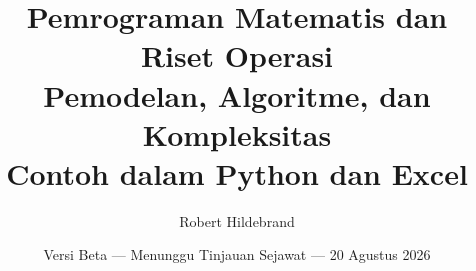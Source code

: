  \title{\textbf{Pemrograman Matematis dan\\ Riset Operasi}\\ Pemodelan, Algoritme, dan Kompleksitas\\
 Contoh dalam Python dan Excel}
  \author{Robert Hildebrand}
  \date{Versi Beta --- Menunggu Tinjauan Sejawat --- 20 Agustus 2026}

